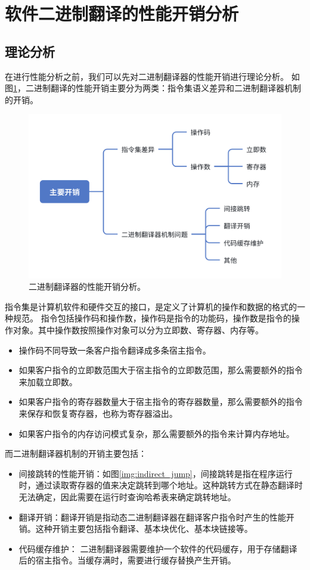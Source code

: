 \section{软件二进制翻译的性能开销分析}\label{sec:bt_overhead_all}

\subsection{理论分析}\label{sec:bt_overhead}

在进行性能分析之前，我们可以先对二进制翻译器的性能开销进行理论分析。
如图\ref{img:bt_overhead}，二进制翻译的性能开销主要分为两类：指令集语义差异和二进制翻译器机制的开销。

\begin{figure}[!htbp]
  \centering
  \includegraphics[width=0.7\linewidth]{./feishuImage/overhead.png}
  \caption{二进制翻译器的性能开销分析。}
  \label{img:bt_overhead}
\end{figure}

指令集是计算机软件和硬件交互的接口，是定义了计算机的操作和数据的格式的一种规范。
指令包括操作码和操作数，操作码是指令的功能码，操作数是指令的操作对象。其中操作数按照操作对象可以分为立即数、寄存器、内存等。
\begin{itemize}
\item 操作码不同导致一条客户指令翻译成多条宿主指令。
\item 如果客户指令的立即数范围大于宿主指令的立即数范围，那么需要额外的指令来加载立即数。
\item 如果客户指令的寄存器数量大于宿主指令的寄存器数量，那么需要额外的指令来保存和恢复寄存器，也称为寄存器溢出。
\item 如果客户指令的内存访问模式复杂，那么需要额外的指令来计算内存地址。
\end{itemize}

而二进制翻译器机制的开销主要包括：
\begin{itemize}
\item 间接跳转的性能开销：如图\ref{img:indirect_jump}，间接跳转是指在程序运行时，通过读取寄存器的值来决定跳转到哪个地址。这种跳转方式在静态翻译时无法确定，因此需要在运行时查询哈希表来确定跳转地址。
\item 翻译开销：翻译开销是指动态二进制翻译器在翻译客户指令时产生的性能开销。这种开销主要包括指令翻译、基本块优化、基本块链接等。
\item 代码缓存维护： 二进制翻译器需要维护一个软件的代码缓存，用于存储翻译后的宿主指令。当缓存满时，需要进行缓存替换产生开销。
\end{itemize}

